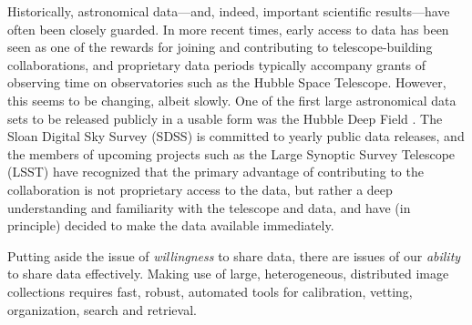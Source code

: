 
Historically, astronomical data---and, indeed, important scientific
results---have often been closely guarded.  In more recent times,
early access to data has been seen as one of the rewards for joining
and contributing to telescope-building collaborations, and proprietary
data periods typically accompany grants of observing time on
observatories such as the Hubble Space Telescope.  However, this seems
to be changing, albeit slowly.  One of the first large astronomical
data sets to be released publicly in a usable form was the Hubble Deep
Field \cite{hubbledeepfield}.  The Sloan Digital Sky Survey (SDSS)
\cite{sdsstechnical} is committed to yearly public data releases, 
and the members of upcoming projects such as the Large Synoptic Survey
Telescope (LSST) \cite{lsst} have recognized that the primary
advantage of contributing to the collaboration is not proprietary
access to the data, but rather a deep understanding and familiarity
with the telescope and data, and have (in principle) decided to make
the data available immediately.




Putting aside the issue of \emph{willingness} to share data, there are
issues of our \emph{ability} to share data effectively.  Making use of
large, heterogeneous, distributed image collections requires fast,
robust, automated tools for calibration, vetting, organization, search
and retrieval.



